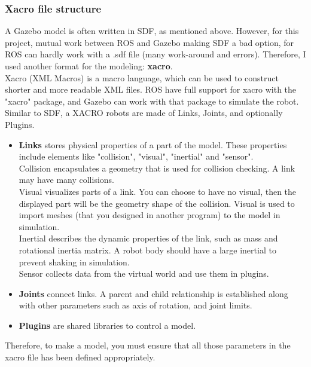 \documentclass[pdftex,12pt,a4paper]{article}
\begin{document}
  \newpage
  \subsubsection{Xacro file structure}
  A Gazebo model is often written in SDF, as mentioned above. However, for this project, mutual work between ROS and Gazebo making SDF a bad option, for ROS can hardly work with a .sdf file (many work-around and errors). Therefore, I used another format for the modeling: \textbf{xacro}.\\
  Xacro (XML Macros) is a macro language, which can be used to construct shorter and more readable XML files. ROS have full support for xacro with the "xacro" package, and Gazebo can work with that package to simulate the robot.\\
  Similar to SDF, a XACRO robots are made of Links, Joints, and optionally Plugins.
  \begin{itemize}
  \item \textbf{Links} stores physical properties of a part of the model. These properties include elements like "collision", "visual", "inertial" and "sensor".\\
  Collision encapsulates a geometry that is used for collision checking. A link may have many collisions.\\
  Visual visualizes parts of a link. You can choose to have no visual, then the displayed part will be the geometry shape of the collision. Visual is used to import meshes (that you designed in another program) to the model in simulation.\\
  Inertial describes the dynamic properties of the link, such as mass and rotational inertia matrix. A robot body should have a large inertial to prevent shaking in simulation.\\
  Sensor collects data from the virtual world and use them in plugins.
  \item \textbf{Joints} connect links. A parent and child relationship is established along with other parameters such as axis of rotation, and joint limits.
  \item \textbf{Plugins} are shared libraries to control a model.
  \end{itemize}
  Therefore, to make a model, you must ensure that all those parameters in the xacro file has been defined appropriately.
  
\end{document}
